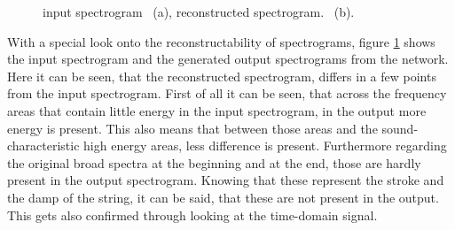 \begin{figure}[htb!]
    \centering
    \caption{input spectrogram ~(a), reconstructed spectrogram. ~(b).}
    \label{fig:res_1D_input_output}
\end{figure}

With a special look onto the reconstructability of spectrograms, figure \ref{fig:res_1D_input_output} shows the input spectrogram and the generated output spectrograms from the network. Here it can be seen, that the reconstructed spectrogram, differs in a few points from the input spectrogram. First of all it can be seen, that across the frequency areas that contain little energy in the input spectrogram, in the output more energy is present. This also means that between those areas and the sound-characteristic high energy areas, less difference is present. Furthermore regarding the original broad spectra at the beginning and at the end, those are hardly present in the output spectrogram. Knowing that these represent the stroke and the damp of the string, it can be said, that these are not present in the output. This gets also confirmed through looking at the time-domain signal.

